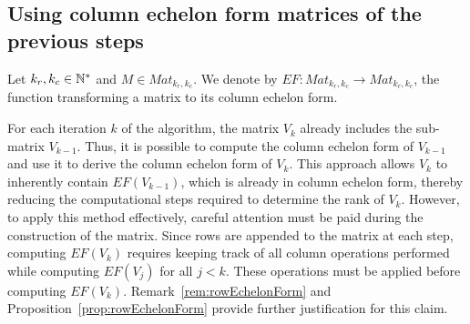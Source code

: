 \documentclass[11pt]{llncs}
\begin{document}
\subsection{Using column echelon form matrices of the previous steps}\label{subsubsection:optEchelonForm}



\begin{definition}
    Let $k_r,k_c\in \mathbb{N}^*$ and $M \in Mat_{k_r,k_c}$.
    We denote by $EF: Mat_{k_r,k_c} \rightarrow Mat_{k_r,k_c}$, the function transforming a matrix to its column echelon form.    
\end{definition}




For each iteration \( k \) of the algorithm, the matrix \( V_k \) already includes the sub-matrix \( V_{k-1} \). Thus, it is possible to compute the column echelon form of \( V_{k-1} \) and use it to derive the column echelon form of \( V_k \). 
This approach allows \( V_k \) to inherently contain \( EF(V_{k-1}) \), which is already in column echelon form, thereby reducing the computational steps required to determine the rank of \( V_k \).
However, to apply this method effectively, careful attention must be paid during the construction of the matrix. 
Since rows are appended to the matrix at each step, computing \( EF(V_k) \) requires keeping track of all column operations performed while computing \( EF(V_j) \) for all \( j < k \). 
These operations must be applied before computing \( EF(V_k) \).
Remark~\ref{rem:rowEchelonForm} and Proposition~\ref{prop:rowEchelonForm} provide further justification for this claim.
\end{document}

